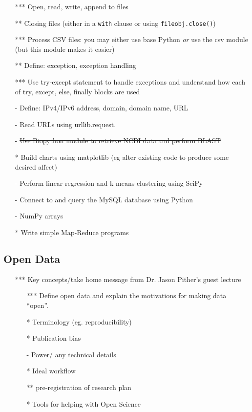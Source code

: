 \documentclass[12pt]{article}%
\begin{document}
\begin{itemize}
 \setlength{\itemsep}{1pt}%
    \setlength{\parskip}{1pt}
\item[***] Open, read, write, append to files
\item[**] Closing files (either in a {\tt with} clause or using {\tt fileobj.close()})
\item[***] Process CSV files: you may either use base Python \textit{or} use the csv module (but this module makes it easier)
\item[**] Define: exception, exception handling
\item[***] Use try-except statement to handle exceptions and understand how each of try, except, else, finally blocks are used
\item[-] Define: IPv4/IPv6 address, domain, domain name, URL
\item[-] Read URLs using urllib.request.
\item[-] \st{Use Biopython module to retrieve NCBI data and perform BLAST}
\item[*] Build charts using matplotlib (eg alter existing code to produce some desired affect)
\item[-] Perform linear regression and k-means clustering using SciPy
\item[-] Connect to and query the MySQL database using Python
\item[-] NumPy arrays
\item[*] Write simple Map-Reduce programs
\end{itemize}


\subsection*{Open Data}
\begin{itemize}
 \setlength{\itemsep}{1pt}%
    \setlength{\parskip}{1pt}
\item[***] Key concepts/take home message from Dr. Jason Pither's guest lecture
\begin{itemize}
\item[***] Define open data and explain the motivations for making data ``open''.
\item[*] Terminology (eg. reproducibility)
\item[*] Publication bias
\item[-] Power/ any technical details
\item[*] Ideal workflow
\item[**] pre-registration of research plan
\item[*] Tools for helping with Open Science
\end{itemize}


\end{itemize}
\end{document}
